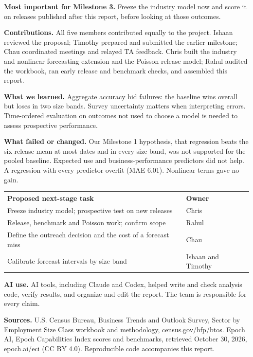 \documentclass[10pt]{article}
\renewcommand{\section}[1]{\needspace{5\baselineskip}\vspace{5pt}{\large\bfseries #1\par}\vspace{1pt}}
\begin{document}
\textbf{Most important for Milestone 3.} Freeze the industry model now and score it on releases published after this report, before looking at those outcomes.

\section{6. Team contributions and reflection}
\textbf{Contributions.} All five members contributed equally to the project. Ishaan reviewed the proposal; Timothy prepared and submitted the earlier milestone; Chau coordinated meetings and relayed TA feedback. Chris built the industry and nonlinear forecasting extension and the Poisson release model; Rahul audited the workbook, ran early release and benchmark checks, and assembled this report.

\textbf{What we learned.} Aggregate accuracy hid failures: the baseline wins overall but loses in two size bands. Survey uncertainty matters when interpreting errors. Time-ordered evaluation on outcomes not used to choose a model is needed to assess prospective performance.

\textbf{What failed or changed.} Our Milestone 1 hypothesis, that regression beats the six-release mean at most dates and in every size band, was not supported for the pooled baseline. Expected use and business-performance predictors did not help. A regression with every predictor overfit (MAE 6.01). Nonlinear terms gave no gain.

\begin{tabular}{@{}ll@{}}
\toprule
Proposed next-stage task & Owner\\\midrule
Freeze industry model; prospective test on new releases & Chris\\
Release, benchmark and Poisson work; confirm scope & Rahul\\
Define the outreach decision and the cost of a forecast miss & Chau\\
Calibrate forecast intervals by size band & Ishaan and Timothy\\\bottomrule
\end{tabular}

\textbf{AI use.} AI tools, including Claude and Codex, helped write and check analysis code, verify results, and organize and edit the report. The team is responsible for every claim.

{\footnotesize\textbf{Sources.} U.S. Census Bureau, Business Trends and Outlook Survey, Sector by Employment Size Class workbook and methodology, census.gov/hfp/btos. Epoch AI, Epoch Capabilities Index scores and benchmarks, retrieved October 30, 2026, epoch.ai/eci (CC BY 4.0). Reproducible code accompanies this report.\par}
\end{document}
